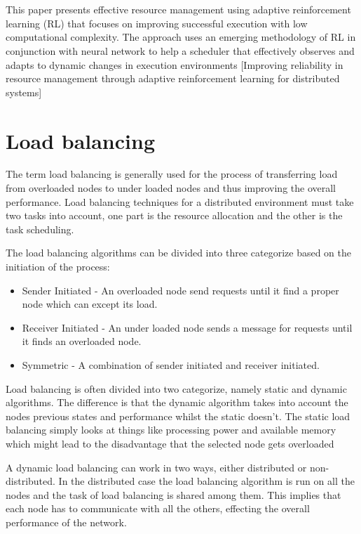 \documentclass{cslthse-msc}
\begin{document}
\\\\
This paper presents effective resource management using adaptive reinforcement learning (RL) that focuses on improving successful execution with low computational complexity. The approach uses an emerging methodology of RL in conjunction with neural network to help a scheduler that effectively observes and adapts to dynamic changes in execution environments [Improving reliability in resource management through adaptive reinforcement learning for distributed systems]

\section{Load balancing}
The term load balancing is generally used for the process of transferring load from overloaded nodes to under loaded nodes and thus improving the overall performance. Load balancing techniques for a distributed environment must take two tasks into account, one part is the resource allocation and the other is the task scheduling. 

The load balancing algorithms can be divided into three categorize based on the initiation of the process:
\begin{itemize}
\item Sender Initiated - An overloaded node send requests until it find a proper node which can except its load.
\item Receiver Initiated - An under loaded node sends a message for requests until it finds an overloaded node.
\item Symmetric - A combination of sender initiated and receiver initiated. 
\end{itemize}

Load balancing is often divided into two categorize, namely static and dynamic algorithms. The difference is that the dynamic algorithm takes into account the nodes previous states and performance whilst the static doesn't. The static load balancing simply looks at things like processing power and available memory which might lead to the disadvantage that the selected node gets overloaded \cite{perfAnalysisLoadCloud}

A dynamic load balancing can work in two ways, either distributed or non-distributed. In the distributed case the load balancing algorithm is run on all the nodes and the task of load  balancing is shared among them. This implies that each node has to communicate with all the others, effecting the overall performance of the network. %
\end{document}
